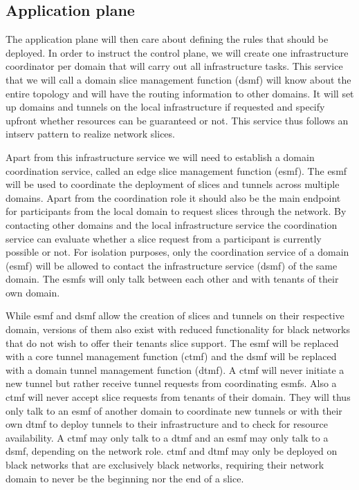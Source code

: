 \subsection{Application plane}
The application plane will then care about defining the rules that should be deployed. In order to instruct the control plane, we will create one infrastructure coordinator per domain that will carry out all infrastructure tasks. This service that we will call a domain slice management function (\acrshort{dsmf}) will know about the entire topology and will have the routing information to other domains. It will set up domains and tunnels on the local infrastructure if requested and specify upfront whether resources can be guaranteed or not. This service thus follows an \acrshort{intserv} pattern to realize network slices.

Apart from this infrastructure service we will need to establish a domain coordination service, called an edge slice management function (\acrshort{esmf}). The \acrshort{esmf} will be used to coordinate the deployment of slices and tunnels across multiple domains. Apart from the coordination role it should also be the main endpoint for participants from the local domain to request slices through the network. By contacting other domains and the local infrastructure service the coordination service can evaluate whether a slice request from a participant is currently possible or not. For isolation purposes, only the coordination service of a domain (\acrshort{esmf}) will be allowed to contact the infrastructure service (\acrshort{dsmf}) of the same domain. The \acrshort{esmf}s will only talk between each other and with tenants of their own domain.

While \acrshort{esmf} and \acrshort{dsmf} allow the creation of slices and tunnels on their respective domain, versions of them also exist with reduced functionality for black networks that do not wish to offer their tenants slice support. The \acrshort{esmf} will be replaced with a core tunnel management function (\acrshort{ctmf}) and the \acrshort{dsmf} will be replaced with a domain tunnel management function (\acrshort{dtmf}). A \acrshort{ctmf} will never initiate a new tunnel but rather receive tunnel requests from coordinating \acrshort{esmf}s. Also a \acrshort{ctmf} will never accept slice requests from tenants of their domain. They will thus only talk to an \acrshort{esmf} of another domain to coordinate new tunnels or with their own \acrshort{dtmf} to deploy tunnels to their infrastructure and to check for resource availability. A \acrshort{ctmf} may only talk to a \acrshort{dtmf} and an \acrshort{esmf} may only talk to a \acrshort{dsmf}, depending on the network role. \acrshort{ctmf} and \acrshort{dtmf} may only be deployed on black networks that are exclusively black networks, requiring their network domain to never be the beginning nor the end of a slice.

